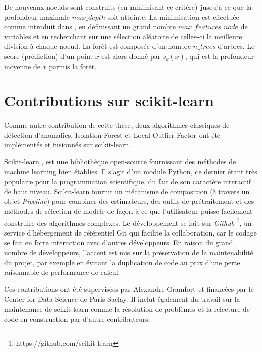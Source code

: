 De nouveaux noeuds sont construits (en minimisant ce critère) jusqu'à ce que la profondeur maximale $ max\_depth $ soit atteinte.
La minimisation est effectuée comme introduit dans \citep{Amit1997}, en définissant un grand nombre $max\_features\_node $ de variables et en recherchant sur une sélection aléatoire de celles-ci la meilleure division à chaque noeud. La forêt est composée d'un nombre $n\_trees$ d'arbres. Le score (prédiction) d'un point $x$ est alors donné par $s_k(x)$, 
qui est la profondeur moyenne de $x$ parmis la forêt. 


\section{Contributions sur scikit-learn}
\label{resume_fr:sec:impl}

Comme autre contribution de cette thèse, deux algorithmes classiques de détection d'anomalies, Isolation Forest et Local Outlier Factor ont été implémentés et fusionnés sur scikit-learn. 

Scikit-learn \citep{sklearn2011}, est une bibliothèque open-source fournissant des méthodes de machine learning bien établies. Il s'agit d'un module Python, ce dernier étant très populaire pour la programmation scientifique, du fait de son caractère interactif de haut niveau. Scikit-learn fournit un mécanisme de composition (à travers un objet \emph{Pipeline}) pour combiner des estimateurs, des outils de prétraitement et des méthodes de sélection de modèle de façon à ce que l'utilisateur puisse facilement construire des algorithmes complexes. Le développement se fait sur \emph{Github} \footnote{https://github.com/scikit-learn}, un service d'hébergement de référentiel Git qui facilite la collaboration, car le codage se fait en forte interaction avec d'autres développeurs. En raison du grand nombre de développeurs, l'accent est mis sur la préservation de la maintenabilité du projet, par exemple en évitant la duplication de code au prix d'une perte raisonnable de performance de calcul.

Ces contributions ont été supervisées par Alexandre Gramfort et financées par le Center for Data Science de Paris-Saclay. Il inclut également du travail sur la maintenance de scikit-learn comme la résolution de problèmes et la relecture de code en construction par d'autre contributeurs. %


